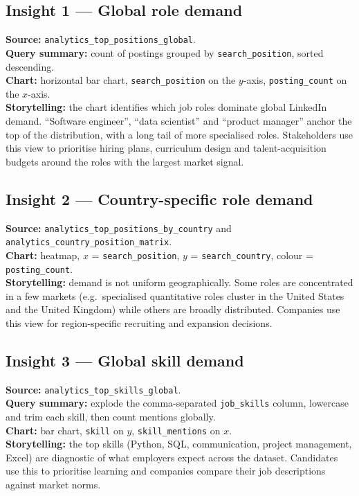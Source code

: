\documentclass[11pt,a4paper]{article}
\begin{document}
\subsection{Insight 1 --- Global role demand}
\textbf{Source:} \texttt{analytics\_top\_positions\_global}.\\
\textbf{Query summary:} count of postings grouped by
\texttt{search\_position}, sorted descending.\\
\textbf{Chart:} horizontal bar chart, \texttt{search\_position} on the
$y$-axis, \texttt{posting\_count} on the $x$-axis.\\
\textbf{Storytelling:} the chart identifies which job roles dominate
global LinkedIn demand.  ``Software engineer'', ``data scientist'' and
``product manager'' anchor the top of the distribution, with a long
tail of more specialised roles.  Stakeholders use this view to
prioritise hiring plans, curriculum design and talent-acquisition
budgets around the roles with the largest market signal.

\subsection{Insight 2 --- Country-specific role demand}
\textbf{Source:} \texttt{analytics\_top\_positions\_by\_country}
and \texttt{analytics\_country\_position\_matrix}.\\
\textbf{Chart:} heatmap, $x$ = \texttt{search\_position},
$y$ = \texttt{search\_country}, colour = \texttt{posting\_count}.\\
\textbf{Storytelling:} demand is not uniform geographically.  Some
roles are concentrated in a few markets (e.g.\ specialised quantitative
roles cluster in the United States and the United Kingdom) while
others are broadly distributed.  Companies use this view for
region-specific recruiting and expansion decisions.

\subsection{Insight 3 --- Global skill demand}
\textbf{Source:} \texttt{analytics\_top\_skills\_global}.\\
\textbf{Query summary:} explode the comma-separated
\texttt{job\_skills} column, lowercase and trim each skill, then count
mentions globally.\\
\textbf{Chart:} bar chart, \texttt{skill} on $y$, \texttt{skill\_mentions}
on $x$.\\
\textbf{Storytelling:} the top skills (Python, SQL, communication,
project management, Excel) are diagnostic of what employers expect
across the dataset.  Candidates use this to prioritise learning and
companies compare their job descriptions against market norms.
\end{document}
